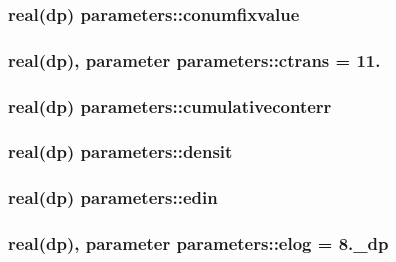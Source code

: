 \hypertarget{classparameters_a7005277ef2b439f6eeb289bc45301138}{
\subsubsection[{conumfixvalue}]{\setlength{\rightskip}{0pt plus 5cm}real(dp) parameters\-::conumfixvalue}}\label{classparameters_a7005277ef2b439f6eeb289bc45301138}
\hypertarget{classparameters_a85e28e166485a3b69202b759d467b578}{
\subsubsection[{ctrans}]{\setlength{\rightskip}{0pt plus 5cm}real(dp), parameter parameters\-::ctrans = 11.}}\label{classparameters_a85e28e166485a3b69202b759d467b578}
\hypertarget{classparameters_ad9be7e2eb2dc1c8bba16c0d460d36d04}{
\subsubsection[{cumulativeconterr}]{\setlength{\rightskip}{0pt plus 5cm}real(dp) parameters\-::cumulativeconterr}}\label{classparameters_ad9be7e2eb2dc1c8bba16c0d460d36d04}
\hypertarget{classparameters_af5c24dcbc6cbcba3779aef88c86b5256}{
\subsubsection[{densit}]{\setlength{\rightskip}{0pt plus 5cm}real(dp) parameters\-::densit}}\label{classparameters_af5c24dcbc6cbcba3779aef88c86b5256}
\hypertarget{classparameters_a32f7fb939e2fb9848883266e78f74156}{
\subsubsection[{edin}]{\setlength{\rightskip}{0pt plus 5cm}real(dp) parameters\-::edin}}\label{classparameters_a32f7fb939e2fb9848883266e78f74156}
\hypertarget{classparameters_a7bf1896be45b605b6ebe6d8e0fdc9362}{
\subsubsection[{elog}]{\setlength{\rightskip}{0pt plus 5cm}real(dp), parameter parameters\-::elog = 8.\-\_\-dp}}\label{classparameters_a7bf1896be45b605b6ebe6d8e0fdc9362}
